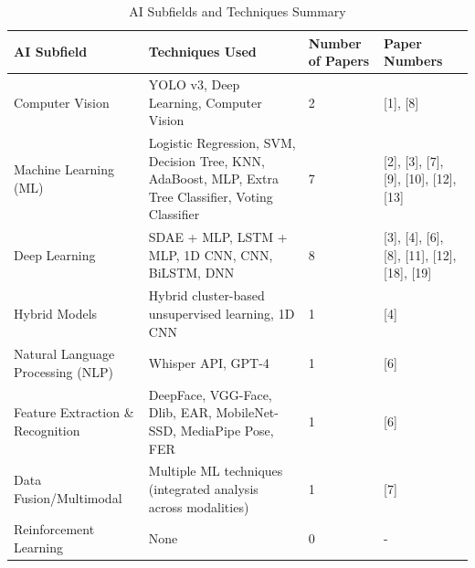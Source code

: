 \documentclass[12pt]{article}
\begin{document}
\begin{table}[H]
\centering
\caption{AI Subfields and Techniques Summary}
\begin{tabular}{|p{4.5cm}|p{6cm}|p{2cm}|p{4cm}|}
\hline
\textbf{AI Subfield} & \textbf{Techniques Used} & \textbf{Number of Papers} & \textbf{Paper Numbers} \\
\hline
Computer Vision & YOLO v3, Deep Learning, Computer Vision & 2 & [1], [8] \\
\hline
Machine Learning (ML) & Logistic Regression, SVM, Decision Tree, KNN, AdaBoost, MLP, Extra Tree Classifier, Voting Classifier & 7 & [2], [3], [7], [9], [10], [12], [13] \\
\hline
Deep Learning & SDAE + MLP, LSTM + MLP, 1D CNN, CNN, BiLSTM, DNN & 8 & [3], [4], [6], [8], [11], [12], [18], [19] \\
\hline
Hybrid Models & Hybrid cluster-based unsupervised learning, 1D CNN & 1 & [4] \\
\hline
Natural Language Processing (NLP) & Whisper API, GPT-4 & 1 & [6] \\
\hline
Feature Extraction \& Recognition & DeepFace, VGG-Face, Dlib, EAR, MobileNet-SSD, MediaPipe Pose, FER & 1 & [6] \\
\hline
Data Fusion/Multimodal & Multiple ML techniques (integrated analysis across modalities) & 1 & [7] \\
\hline
Reinforcement Learning & None & 0 & - \\
\hline
\end{tabular}
\end{table}
\end{document}
